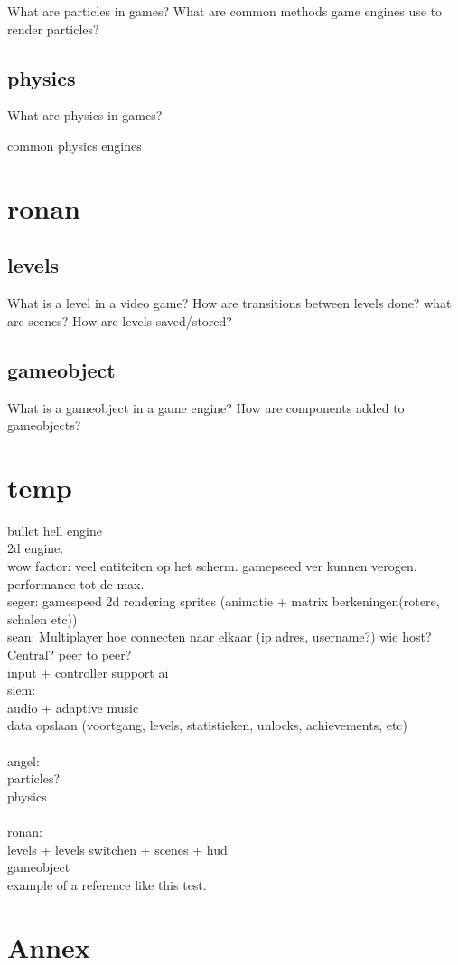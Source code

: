\documentclass{article} %
\begin{document}
What are particles in games?
What are common methods game engines use to render particles?
\subsection{physics}
What are physics in games?

common physics engines

\newpage

\section{ronan}
\subsection{levels}
What is a level in a video game?
How are transitions between levels done?
what are scenes?
How are levels saved/stored?
\subsection{gameobject}
What is a gameobject in a game engine?
How are components added to gameobjects?

\newpage

\section{temp}
bullet hell engine
\\
2d engine.
\\
wow factor: veel entiteiten op het scherm. gamepseed ver kunnen verogen.
performance tot de max.
\\
seger:
gamespeed
2d rendering
sprites (animatie + matrix berkeningen(rotere, schalen etc))
\\
sean:
Multiplayer
hoe connecten naar elkaar (ip adres, username?)
wie host? Central? peer to peer?
\\
input + controller support
ai
\\
siem:\\
audio + adaptive music\\
data opslaan (voortgang, levels, statistieken, unlocks, achievements, etc)\\
\\
angel:\\
particles?\\
physics\\
\\
ronan:\\
levels + levels switchen + scenes + hud \\
gameobject
\\

example of a reference \cite{Gambetta_2024} like this test.


\newpage

\section{Annex}
\printbibliography %
\end{document}

